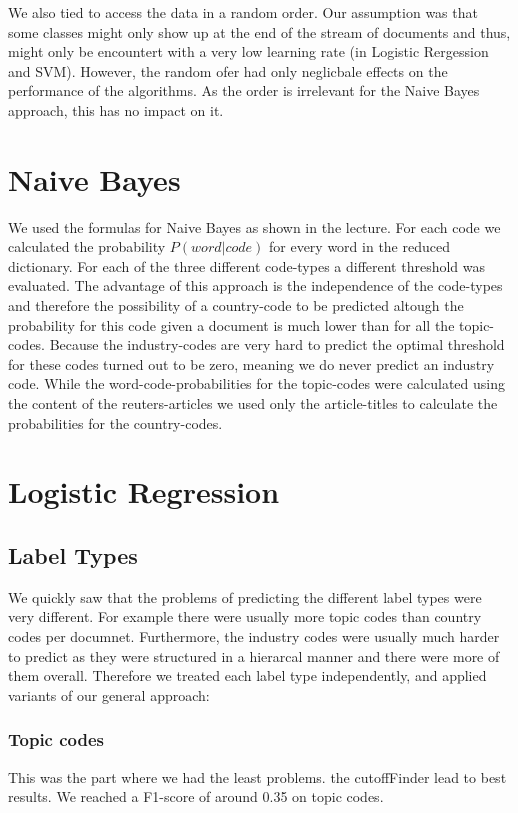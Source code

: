 \documentclass{article}
\begin{document}
We also tied to access the data in a random order. Our assumption was that some classes might only show up at the end of the stream of documents and thus, might only be encountert with a very low learning rate (in Logistic Rergession and SVM).
However, the random ofer had only neglicbale effects on the performance of the algorithms. As the order is irrelevant for the Naive Bayes approach, this has no impact on it.

\section*{Naive Bayes}
We used the formulas for Naive Bayes as shown in the lecture. For each code we calculated the probability $P(word | code)$ for every word in the reduced dictionary.
For each of the three different code-types a different threshold was evaluated. The advantage of this approach is the independence of the code-types and therefore the possibility of a country-code to be predicted altough the probability for this code given a document is much lower than for all the topic-codes. Because the industry-codes are very hard to predict the optimal threshold for these codes turned out to be zero, meaning we do never predict an industry code.
While the word-code-probabilities for the topic-codes were calculated using the content of the reuters-articles we used only the article-titles to calculate the probabilities for the country-codes. 

\section*{Logistic Regression}
\subsection{Label Types}
        We quickly saw that the problems of predicting the different label types were very different. For example there were usually more topic codes than  country codes per documnet. Furthermore, the industry codes were usually much harder to predict as they were structured in a hierarcal manner and there were more of them overall. Therefore we treated each label type independently, and applied variants of our general approach:
            \subsubsection{ Topic codes}
                This was the part where we had the least problems. the cutoffFinder lead to best results.  We reached a F1-score of around 0.35 on topic codes.
\end{document}
